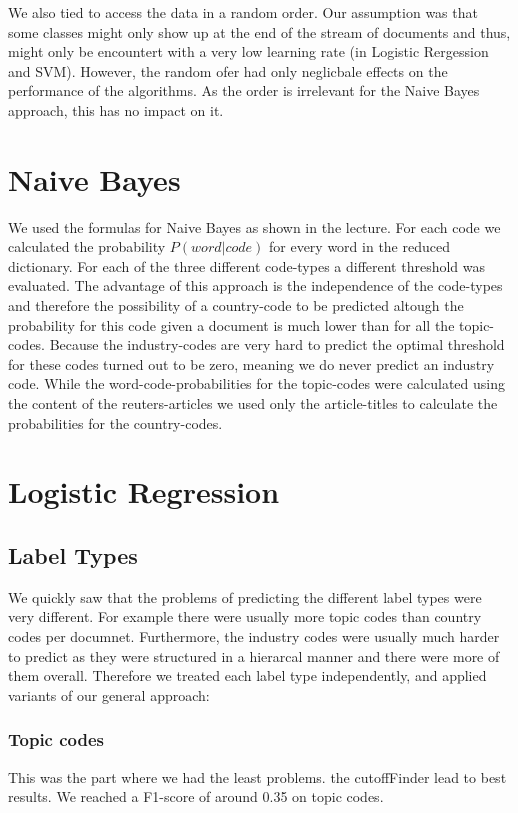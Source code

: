 \documentclass{article}
\begin{document}
We also tied to access the data in a random order. Our assumption was that some classes might only show up at the end of the stream of documents and thus, might only be encountert with a very low learning rate (in Logistic Rergession and SVM).
However, the random ofer had only neglicbale effects on the performance of the algorithms. As the order is irrelevant for the Naive Bayes approach, this has no impact on it.

\section*{Naive Bayes}
We used the formulas for Naive Bayes as shown in the lecture. For each code we calculated the probability $P(word | code)$ for every word in the reduced dictionary.
For each of the three different code-types a different threshold was evaluated. The advantage of this approach is the independence of the code-types and therefore the possibility of a country-code to be predicted altough the probability for this code given a document is much lower than for all the topic-codes. Because the industry-codes are very hard to predict the optimal threshold for these codes turned out to be zero, meaning we do never predict an industry code.
While the word-code-probabilities for the topic-codes were calculated using the content of the reuters-articles we used only the article-titles to calculate the probabilities for the country-codes. 

\section*{Logistic Regression}
\subsection{Label Types}
        We quickly saw that the problems of predicting the different label types were very different. For example there were usually more topic codes than  country codes per documnet. Furthermore, the industry codes were usually much harder to predict as they were structured in a hierarcal manner and there were more of them overall. Therefore we treated each label type independently, and applied variants of our general approach:
            \subsubsection{ Topic codes}
                This was the part where we had the least problems. the cutoffFinder lead to best results.  We reached a F1-score of around 0.35 on topic codes.
\end{document}
